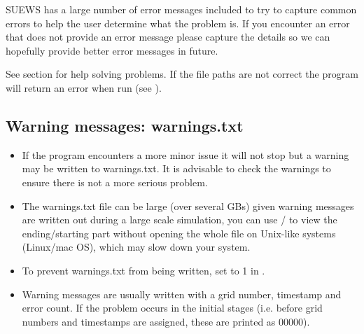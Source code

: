 \documentclass[letterpaper,10pt,english]{sphinxmanual}
\begin{document}
SUEWS has a large number of error messages included to try to capture
common errors to help the user determine what the problem is. If you
encounter an error that does not provide an error message please capture
the details so we can hopefully provide better error messages in future.

See {\hyperref[\detokenize{troubleshooting:troubleshooting}]{}} section for help solving
problems. If the file paths are not correct the program will return an
error when run (see {\hyperref[\detokenize{prepare-to-run-the-model:preparing-to-run-the-model}]{}}).


\subsection{Warning messages: warnings.txt}
\label{\detokenize{output_files/output_files:warning-messages-warnings-txt}}\label{\detokenize{output_files/output_files:warnings-txt}}\begin{itemize}
\item {} 
If the program encounters a more minor issue it will not stop but a
warning may be written to warnings.txt. It is advisable to check the
warnings to ensure there is not a more serious problem.

\item {} 
The warnings.txt file can be large (over several GBs) given warning
messages are written out during a large scale simulation, you can use
/ to view the ending/starting part without opening
the whole file on Unix-like systems (Linux/mac OS), which may slow
down your system.

\item {} 
To prevent warnings.txt from being written, set 
to 1 in {\hyperref[\detokenize{input_files/RunControl/RunControl:runcontrol-nml}]{}}.

\item {} 
Warning messages are usually written with a grid number, timestamp
and error count. If the problem occurs in the initial stages (i.e.
before grid numbers and timestamps are assigned, these are printed as
00000).

\end{itemize}
\end{document}
